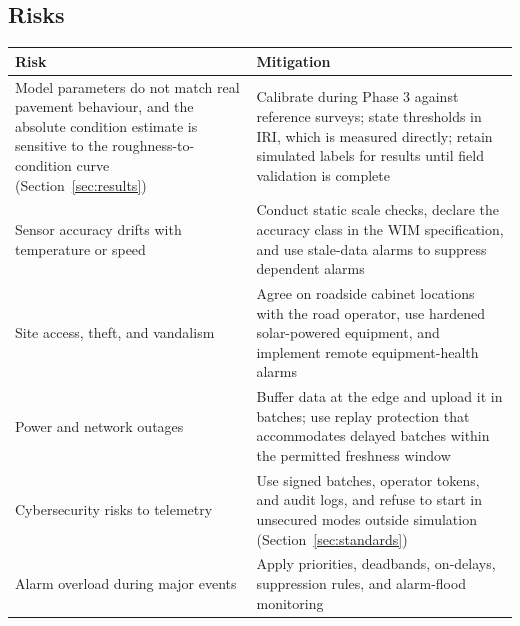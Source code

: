 \documentclass[11pt,a4paper]{article}
\begin{document}
\subsection{Risks}
\begin{center}
\small
\begin{tabularx}{\textwidth}{@{}L{4.4cm} X@{}}
\toprule
\textbf{Risk} & \textbf{Mitigation}\\
\midrule
Model parameters do not match real pavement behaviour, and the absolute condition estimate is sensitive to the roughness-to-condition curve (Section~\ref{sec:results}) & Calibrate during Phase 3 against reference surveys; state thresholds in IRI, which is measured directly; retain simulated labels for results until field validation is complete\\[4pt]
Sensor accuracy drifts with temperature or speed & Conduct static scale checks, declare the accuracy class in the WIM specification, and use stale-data alarms to suppress dependent alarms\\[4pt]
Site access, theft, and vandalism & Agree on roadside cabinet locations with the road operator, use hardened solar-powered equipment, and implement remote equipment-health alarms\\[4pt]
Power and network outages & Buffer data at the edge and upload it in batches; use replay protection that accommodates delayed batches within the permitted freshness window\\[4pt]
Cybersecurity risks to telemetry & Use signed batches, operator tokens, and audit logs, and refuse to start in unsecured modes outside simulation (Section~\ref{sec:standards})\\[4pt]
Alarm overload during major events & Apply priorities, deadbands, on-delays, suppression rules, and alarm-flood monitoring\\
\bottomrule
\end{tabularx}
\end{center}
\end{document}
